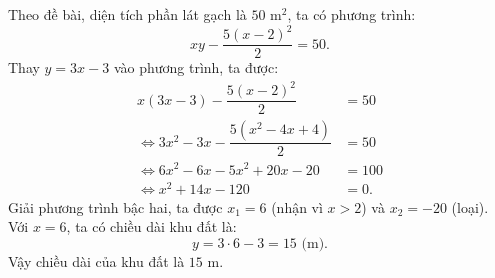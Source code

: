 \begin{bt}
{\begin{enumerate}[a)]
	Theo đề bài, diện tích phần lát gạch là $50\text{ m}^2$, ta có phương trình:
	$$xy - \dfrac{5(x - 2)^2}{2} = 50.$$
	Thay $y = 3x - 3$ vào phương trình, ta được:
	\begin{align*}
		x(3x - 3) - \dfrac{5(x - 2)^2}{2} &= 50 \\
		\iff 3x^2 - 3x - \dfrac{5(x^2 - 4x + 4)}{2} &= 50 \\
		\iff 6x^2 - 6x - 5x^2 + 20x - 20 &= 100 \\
		\iff x^2 + 14x - 120 &= 0.
	\end{align*}
	Giải phương trình bậc hai, ta được $x_1 = 6$ (nhận vì $x > 2$) và $x_2 = -20$ (loại).\\
	Với $x = 6$, ta có chiều dài khu đất là:
	$$y = 3 \cdot 6 - 3 = 15\text{ (m)}.$$
	Vậy chiều dài của khu đất là $15\text{ m}$.
\end{enumerate}
}
\end{bt}


